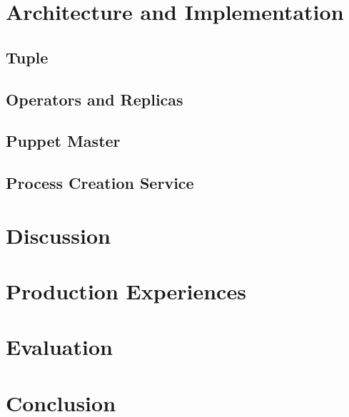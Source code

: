 \documentclass[times, 10pt, twocolumn]{article}
\begin{document}
\section{Architecture and Implementation}





\subsection{Tuple}




\subsection{Operators and Replicas}







\subsection{Puppet Master}






\subsection{Process Creation Service}






\section{Discussion}




\section{Production Experiences}





\section{Evaluation}






\section{Conclusion}
\end{document}
